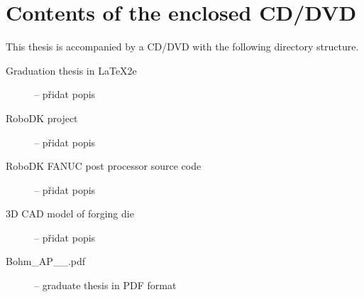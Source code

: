 ﻿\chapter{Contents of the enclosed CD/DVD \label{ch:ApendCD}}

This thesis is accompanied by a CD/DVD with the following directory structure.

\begin{description}

    \item[Graduation thesis in \LaTeX2e] -- přidat popis 
            
    \item[RoboDK project] -- přidat popis 

    \item[RoboDK FANUC post processor source code] -- přidat popis 

    \item[3D CAD model of forging die] -- přidat popis 

    \item[Bohm\_AP\_\the\value{YearOld}\_\Year.pdf] -- graduate thesis in PDF format

\end{description}

